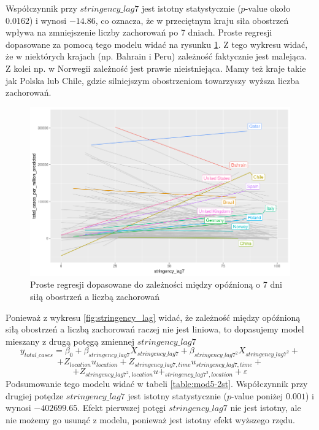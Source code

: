 \documentclass[12pt]{mwbk}
\theoremstyle{plain}
\theoremstyle{definition}
\theoremstyle{definition}
\newcommand\zrodlo[1]{\par\vspace{-3mm}{\small\textit{Źródło: }#1 }}
\begin{document}
Współczynnik przy $stringency\_lag7$ jest istotny statystycznie ($p$-value około $0.0162$) i wynosi $-14.86$, co oznacza, że w przeciętnym kraju siła obostrzeń wpływa na zmniejszenie liczby zachorowań po 7 dniach. Proste regresji dopasowane za pomocą tego modelu widać na rysunku \ref{fig:stringency_1st}. Z tego wykresu widać, że w niektórych krajach (np. Bahrain i Peru) zależność faktycznie jest malejąca. Z kolei np. w Norwegii zależność jest prawie nieistniejąca. Mamy też kraje takie jak Polska lub Chile, gdzie silniejszym obostrzeniom towarzyszy wyższa liczba zachorowań.
\newpage
\begin{figure}[!h]
	\centering
	\includegraphics[width=\linewidth]{rys/stringency_1st.png}
	\caption{Proste regresji dopasowane do zależności między opóźnioną o 7 dni siłą obostrzeń a liczbą zachorowań }
	\label{fig:stringency_1st}
	\zrodlo{Opracowanie własne}
\end{figure}

Ponieważ z wykresu \ref{fig:stringency_lag} widać, że zależność między opóźnioną siłą obostrzeń a liczbą zachorowań raczej nie jest liniowa, to dopasujemy model mieszany z drugą potęgą zmiennej $stringency\_lag7$
$$y_{total\_cases}=\beta_0+\beta_{stringency\_lag7} X_{stringency\_lag7}+ \beta_{stringency\_lag7^2} X_{stringency\_lag7^2}+$$$$+Z_{location}u_{location}+Z_{stringency\_lag7,time}u_{stringency\_lag7,time}+$$$$+Z_{stringency\_lag7^2, location}u+_{stringency\_lag7^2, location}+\varepsilon$$
Podsumowanie tego modelu widać w tabeli \ref{table:mod5-2st}. Współczynnik przy drugiej potędze $stringency\_lag7$ jest istotny statystycznie ($p$-value poniżej $0.001$) i wynosi $-402699.65$. Efekt pierwszej potęgi $stringency\_lag7$ nie jest istotny, ale nie możemy go usunąć z modelu, ponieważ jest istotny efekt wyższego rzędu.
\end{document}

